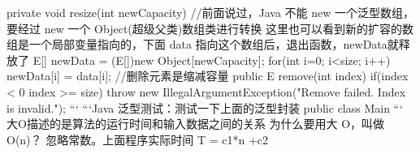 {}private void resize(int newCapacity)\markdownRendererLeftBrace{} //前面说过，Java 不能 new 一个泛型数组，要经过 new 一个 Object(超级父类)数组类进行转换 这里也可以看到新的扩容的数组是一个局部变量指向的，下面 data 指向这个数组后，退出函数，newData就释放了 E[] newData = (E[])new Object[newCapacity]; for(int i=0; i<size; i++)\markdownRendererLeftBrace{} newData[i] = data[i];\markdownRendererLineBreak
{}\markdownRendererRightBrace{}\markdownRendererInterblockSeparator
{}\markdownRendererInterblockSeparator
{}\markdownRendererRightBrace{}\markdownRendererInterblockSeparator
{}//删除元素是缩减容量 public E remove(int index)\markdownRendererLeftBrace{} if(index < 0 \markdownRendererPipe{}\markdownRendererPipe{} index >= size)\markdownRendererLeftBrace{} throw new IllegalArgumentException("Remove failed. Index is invalid.");\markdownRendererLineBreak
{}\markdownRendererRightBrace{}\markdownRendererInterblockSeparator
{}\markdownRendererInterblockSeparator
{}\markdownRendererRightBrace{}\markdownRendererInterblockSeparator
{}```\markdownRendererInterblockSeparator
{}```Java 泛型测试：测试一下上面的泛型封装 public class Main\markdownRendererLeftBrace{}\markdownRendererInterblockSeparator
{}\markdownRendererInterblockSeparator
{}\markdownRendererRightBrace{}\markdownRendererInterblockSeparator
{}```\markdownRendererInterblockSeparator
{}\markdownRendererInterblockSeparator
{}大\markdownRendererDollarSign{}O\markdownRendererDollarSign{}描述的是算法的运行时间和输入数据之间的关系 \markdownRendererInterblockSeparator
{}为什么要用大 O，叫做 O(n)？ 忽略常数。上面程序实际时间 \markdownRendererDollarSign{}T = c1*n +c2\markdownRendererDollarSign{}\markdownRendererInterblockSeparator
{}\markdownRendererUlBeginTight
\markdownRendererUlItem {}\markdownRendererUlItemEnd 
\markdownRendererUlItem {}\markdownRendererUlItemEnd 
\markdownRendererUlEndTight \markdownRendererInterblockSeparator
